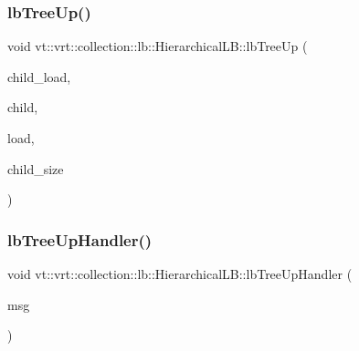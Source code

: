 \subsubsection{\texorpdfstring{lb\+Tree\+Up()}{lbTreeUp()}}
{\footnotesize\ttfamily void vt\+::vrt\+::collection\+::lb\+::\+Hierarchical\+L\+B\+::lb\+Tree\+Up (\begin{DoxyParamCaption}\item[{\hyperlink{namespacevt_a8fb51741340b87d7aaee0bef60e9896b}{Load\+Type} const}]{child\+\_\+load,  }\item[{\hyperlink{namespacevt_a866da9d0efc19c0a1ce79e9e492f47e2}{Node\+Type} const}]{child,  }\item[{\hyperlink{structvt_1_1vrt_1_1collection_1_1lb_1_1_load_sampler_base_l_b_a8d939a849ec0d6371c1c4d441ffb9b94}{Obj\+Sample\+Type}}]{load,  }\item[{\hyperlink{namespacevt_a866da9d0efc19c0a1ce79e9e492f47e2}{Node\+Type} const}]{child\+\_\+size }\end{DoxyParamCaption})\hspace{0.3cm}{\ttfamily [private]}}

\mbox{\label{structvt_1_1vrt_1_1collection_1_1lb_1_1_hierarchical_l_b_a3b67d27c10a6a7532c9c5d1a57ab722a}} 
\subsubsection{\texorpdfstring{lb\+Tree\+Up\+Handler()}{lbTreeUpHandler()}}
{\footnotesize\ttfamily void vt\+::vrt\+::collection\+::lb\+::\+Hierarchical\+L\+B\+::lb\+Tree\+Up\+Handler (\begin{DoxyParamCaption}\item[{\hyperlink{structvt_1_1vrt_1_1collection_1_1lb_1_1_l_b_tree_up_msg}{L\+B\+Tree\+Up\+Msg} $\ast$}]{msg }\end{DoxyParamCaption})\hspace{0.3cm}{\ttfamily [private]}}

\mbox{\label{structvt_1_1vrt_1_1collection_1_1lb_1_1_hierarchical_l_b_a8a9d35f8b4a8cd21461209136e64ad30}} 
